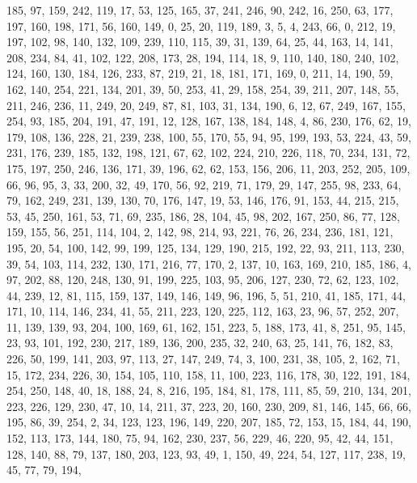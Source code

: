 \begin{DoxyCode}
       185, 97, 159, 242, 119, 17, 53, 125, 165, 37, 241, 246, 90, 242, 16, 250, 63, 177, 197, 160, 198, 171, 56,
       160, 149, 0, 25, 20, 119, 189, 3, 5, 4, 243, 66, 0, 212, 19, 197, 102, 98, 140, 132, 109, 239, 110, 115, 39,
       31, 139, 64, 25, 44, 163, 14, 141, 208, 234, 84, 41, 102, 122, 208, 173, 28, 194, 114, 18, 9, 110, 140, 180,
       240, 102, 124, 160, 130, 184, 126, 233, 87, 219, 21, 18, 181, 171, 169, 0, 211, 14, 190, 59, 162, 140, 254,
       221, 134, 201, 39, 50, 253, 41, 29, 158, 254, 39, 211, 207, 148, 55, 211, 246, 236, 11, 249, 20, 249, 87,
       81, 103, 31, 134, 190, 6, 12, 67, 249, 167, 155, 254, 93, 185, 204, 191, 47, 191, 12, 128, 167, 138, 184,
       148, 4, 86, 230, 176, 62, 19, 179, 108, 136, 228, 21, 239, 238, 100, 55, 170, 55, 94, 95, 199, 193, 53, 224,
       43, 59, 231, 176, 239, 185, 132, 198, 121, 67, 62, 102, 224, 210, 226, 118, 70, 234, 131, 72, 175, 197, 250,
       246, 136, 171, 39, 196, 62, 62, 153, 156, 206, 11, 203, 252, 205, 109, 66, 96, 95, 3, 33, 200, 32, 49, 170,
       56, 92, 219, 71, 179, 29, 147, 255, 98, 233, 64, 79, 162, 249, 231, 139, 130, 70, 176, 147, 19, 53, 146, 176,
       91, 153, 44, 215, 215, 53, 45, 250, 161, 53, 71, 69, 235, 186, 28, 104, 45, 98, 202, 167, 250, 86, 77, 128,
       159, 155, 56, 251, 114, 104, 2, 142, 98, 214, 93, 221, 76, 26, 234, 236, 181, 121, 195, 20, 54, 100, 142,
       99, 199, 125, 134, 129, 190, 215, 192, 22, 93, 211, 113, 230, 39, 54, 103, 114, 232, 130, 171, 216, 77, 170,
       2, 137, 10, 163, 169, 210, 185, 186, 4, 97, 202, 88, 120, 248, 130, 91, 199, 225, 103, 95, 206, 127, 230,
       72, 62, 123, 102, 44, 239, 12, 81, 115, 159, 137, 149, 146, 149, 96, 196, 5, 51, 210, 41, 185, 171, 44, 171,
       10, 114, 146, 234, 41, 55, 211, 223, 120, 225, 112, 163, 23, 96, 57, 252, 207, 11, 139, 139, 93, 204, 100,
       169, 61, 162, 151, 223, 5, 188, 173, 41, 8, 251, 95, 145, 23, 93, 101, 192, 230, 217, 189, 136, 200, 235, 32,
       240, 63, 25, 141, 76, 182, 83, 226, 50, 199, 141, 203, 97, 113, 27, 147, 249, 74, 3, 100, 231, 38, 105, 2,
       162, 71, 15, 172, 234, 226, 30, 154, 105, 110, 158, 11, 100, 223, 116, 178, 30, 122, 191, 184, 254, 250, 148,
       40, 18, 188, 24, 8, 216, 195, 184, 81, 178, 111, 85, 59, 210, 134, 201, 223, 226, 129, 230, 47, 10, 14,
       211, 37, 223, 20, 160, 230, 209, 81, 146, 145, 66, 66, 195, 86, 39, 254, 2, 34, 123, 123, 196, 149, 220, 207,
       185, 72, 153, 15, 184, 44, 190, 152, 113, 173, 144, 180, 75, 94, 162, 230, 237, 56, 229, 46, 220, 95, 42, 44,
       151, 128, 140, 88, 79, 137, 180, 203, 123, 93, 49, 1, 150, 49, 224, 54, 127, 117, 238, 19, 45, 77, 79, 194,

\end{DoxyCode}
